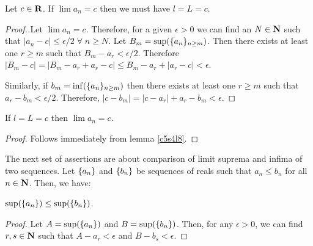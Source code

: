 \begin{lem}\label{c5s4l11}
Let $c \in \mathbf{R}$. If $\lim a_n = c$ then we must have $l = L = c$. 
\end{lem}
\begin{proof}
Let $\lim a_n = c$. Therefore, for a given $\epsilon > 0$ we can find an
$N \in \mathbf{N}$ such that $|a_n - c| \le \epsilon/2 \;\forall\; n \ge N$. Let
$B_m = \sup(\{a_n\}_{n \ge m})$. Then there exists at least one $r \ge m$
such that $B_m - a_r < \epsilon/2$. Therefore $|B_m - c| = |B_m - a_r + a_r
- c| \le B_m - a_r + |a_r - c| < \epsilon$.

Similarly, if $b_m = \inf(\{a_n\}_{n \ge m})$ then there exists at least
one $r \ge m$ such that $a_r - b_m < \epsilon/2$. Therefore, $|c - b_m| =
|c - a_r| + a_r - b_m < \epsilon$.
\end{proof}

\begin{lem}\label{c5s4l12}
If $l = L = c$ then $\lim a_n = c$.
\end{lem}
\begin{proof}
Follows immediately from lemma \ref{c5s4l8}.
\end{proof}

The next set of assertions are about comparison of limit suprema and infima
of two sequences. Let $\{a_n\}$ and $\{b_n\}$ be sequences of reals
such that $a_n \le b_n$ for all $n \in \mathbf{N}$. Then, we have:
\begin{lem}\label{c5s4l13}
$\sup(\{a_n\}) \le \sup(\{b_n\})$.
\end{lem}
\begin{proof}
Let $A = \sup(\{a_n\})$ and $B = \sup(\{b_n\})$. Then, for any $\epsilon
> 0$, we can find $r, s \in \mathbf{N}$ such that $A - a_r < \epsilon$ and $B - 
b_s < \epsilon$. 
\end{proof}
